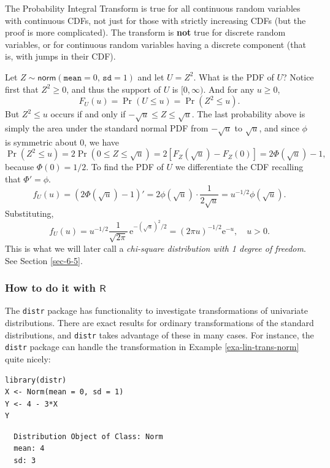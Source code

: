 \documentclass[captions=tableheading]{scrbook}
\begin{document}
\begin{fact}
The Probability Integral Transform is true for all continuous random variables with continuous CDFs, not just for those with strictly increasing CDFs (but the proof is more complicated). The transform is \textbf{not} true for discrete random variables, or for continuous random variables having a discrete component (that is, with jumps in their CDF).
\end{fact}

\begin{example}
Let \(Z\sim\mathsf{norm}(\mathtt{mean}=0,\,\mathtt{sd}=1)\) and let \(U=Z^{2}\). What is the PDF of \(U\)? 
Notice first that \(Z^{2}\geq0\), and thus the support of \(U\) is \([0,\infty)\). And for any \(u\geq0\), 
\[
F_{U}(u)=\Pr(U\leq u)=\Pr(Z^{2}\leq u).
\]
But \(Z^{2}\leq u\) occurs if and only if \(-\sqrt{u}\leq Z\leq\sqrt{u}\). The last probability above is simply the area under the standard normal PDF from \(-\sqrt{u}\) to \(\sqrt{u}\), and since \(\phi\) is symmetric about 0, we have
\[
\Pr(Z^{2}\leq u)=2\Pr(0\leq Z\leq\sqrt{u})=2\left[F_{Z}(\sqrt{u})-F_{Z}(0)\right]=2\Phi(\sqrt{u})-1,
\]
because \(\Phi(0)=1/2\). To find the PDF of \(U\) we differentiate the CDF recalling that \(\Phi'=\phi\).
\[
f_{U}(u)=\left(2\Phi(\sqrt{u})-1\right)'=2\phi(\sqrt{u})\cdot\frac{1}{2\sqrt{u}}=u^{-1/2}\phi(\sqrt{u}).
\]
Substituting,
\[
f_{U}(u)=u^{-1/2}\frac{1}{\sqrt{2\pi}}\,\mathrm{e}^{-(\sqrt{u})^{2}/2}=(2\pi u)^{-1/2}\mathrm{e}^{-u},\quad u>0.
\]
This is what we will later call a \emph{chi-square distribution with 1 degree of freedom}. See Section \ref{sec-6-5}.
\end{example}
\subsubsection{How to do it with \(\mathsf{R}\)}
\label{sec-6-4-2-1}


The \texttt{distr} package has functionality to investigate transformations of univariate distributions. There are exact results for ordinary transformations of the standard distributions, and \texttt{distr} takes advantage of these in many cases. For instance, the \texttt{distr} package can handle the transformation in Example \ref{exa-lin-trans-norm} quite nicely:


\begin{verbatim}
library(distr)
X <- Norm(mean = 0, sd = 1)
Y <- 4 - 3*X
Y
\end{verbatim}

\begin{verbatim}
  Distribution Object of Class: Norm
  mean: 4
  sd: 3
\end{verbatim}
\end{document}
